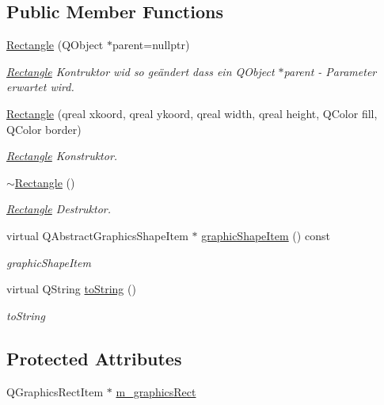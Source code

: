 \subsection*{Public Member Functions}
\begin{DoxyCompactItemize}
\item 
\hyperlink{class_rectangle_a3a431eeb9b63f2108f171416b205f302}{Rectangle} (Q\+Object $\ast$parent=nullptr)
\begin{DoxyCompactList}\small\item\em \hyperlink{class_rectangle}{Rectangle} Kontruktor wid so geändert dass ein Q\+Object $\ast$parent -\/ Parameter erwartet wird. \end{DoxyCompactList}\item 
\hyperlink{class_rectangle_a07eb215e78b898b77cb843ceb497b46a}{Rectangle} (qreal xkoord, qreal ykoord, qreal width, qreal height, Q\+Color fill, Q\+Color border)
\begin{DoxyCompactList}\small\item\em \hyperlink{class_rectangle}{Rectangle} Konstruktor. \end{DoxyCompactList}\item 
\hyperlink{class_rectangle_a494c076b13aadf26efdce07d23c61ddd}{$\sim$\+Rectangle} ()
\begin{DoxyCompactList}\small\item\em \hyperlink{class_rectangle}{Rectangle} Destruktor. \end{DoxyCompactList}\item 
virtual Q\+Abstract\+Graphics\+Shape\+Item $\ast$ \hyperlink{class_rectangle_aeafbe16d72e37bb155c78a122408d3dc}{graphic\+Shape\+Item} () const
\begin{DoxyCompactList}\small\item\em graphic\+Shape\+Item \end{DoxyCompactList}\item 
virtual Q\+String \hyperlink{class_rectangle_a75b1e77ef828ff8de86cfcf6b03bfadb}{to\+String} ()
\begin{DoxyCompactList}\small\item\em to\+String \end{DoxyCompactList}\end{DoxyCompactItemize}
\subsection*{Protected Attributes}
\begin{DoxyCompactItemize}
\item 
Q\+Graphics\+Rect\+Item $\ast$ \hyperlink{class_rectangle_a4d7f03c65f5e27a63a3299aac6da3954}{m\+\_\+graphics\+Rect}
\end{DoxyCompactItemize}
